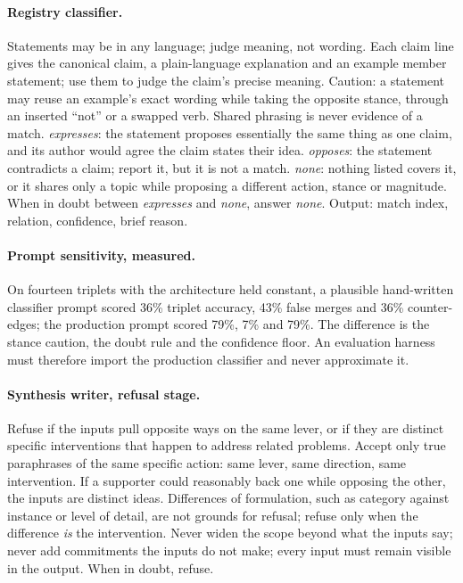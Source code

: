 \documentclass{article}
\begin{document}
\paragraph{Registry classifier.} Statements may be in any language; judge meaning, not wording. Each claim line gives the canonical claim, a plain-language explanation and an example member statement; use them to judge the claim's precise meaning. Caution: a statement may reuse an example's exact wording while taking the opposite stance, through an inserted ``not'' or a swapped verb. Shared phrasing is never evidence of a match. \emph{expresses}: the statement proposes essentially the same thing as one claim, and its author would agree the claim states their idea. \emph{opposes}: the statement contradicts a claim; report it, but it is not a match. \emph{none}: nothing listed covers it, or it shares only a topic while proposing a different action, stance or magnitude. When in doubt between \emph{expresses} and \emph{none}, answer \emph{none}. Output: match index, relation, confidence, brief reason.

\paragraph{Prompt sensitivity, measured.} On fourteen triplets with the architecture held constant, a plausible hand-written classifier prompt scored 36\% triplet accuracy, 43\% false merges and 36\% counter-edges; the production prompt scored 79\%, 7\% and 79\%. The difference is the stance caution, the doubt rule and the confidence floor. An evaluation harness must therefore import the production classifier and never approximate it.

\paragraph{Synthesis writer, refusal stage.} Refuse if the inputs pull opposite ways on the same lever, or if they are distinct specific interventions that happen to address related problems. Accept only true paraphrases of the same specific action: same lever, same direction, same intervention. If a supporter could reasonably back one while opposing the other, the inputs are distinct ideas. Differences of formulation, such as category against instance or level of detail, are not grounds for refusal; refuse only when the difference \emph{is} the intervention. Never widen the scope beyond what the inputs say; never add commitments the inputs do not make; every input must remain visible in the output. When in doubt, refuse.
\end{document}
